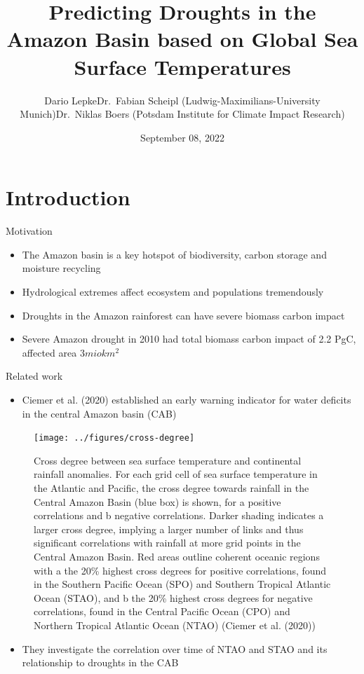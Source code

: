 \documentclass[
  ignorenonframetext,
]{beamer}
\title{Predicting Droughts in the Amazon Basin based on Global Sea
Surface Temperatures}
\author{Dario Lepke\newline Dr.~Fabian Scheipl
(Ludwig-Maximilians-University Munich)\newline Dr.~Niklas Boers (Potsdam
Institute for Climate Impact Research)}
\date{September 08, 2022}
\providecommand{\tightlist}{%
  \setlength{\itemsep}{0pt}\setlength{\parskip}{0pt}}
\begin{document}
\frame{\titlepage}

\begin{frame}[allowframebreaks]
  \tableofcontents[hideallsubsections]
\end{frame}
\hypertarget{introduction}{%
\section{Introduction}\label{introduction}}

\begin{frame}{Motivation}
\protect\hypertarget{motivation}{}
\begin{itemize}
\item
  The Amazon basin is a key hotspot of biodiversity, carbon storage and
  moisture recycling
\item
  Hydrological extremes affect ecosystem and populations tremendously
\item
  Droughts in the Amazon rainforest can have severe biomass carbon
  impact
\item
  Severe Amazon drought in 2010 had total biomass carbon impact of 2.2
  PgC, affected area \(3 mio km^2\)
\end{itemize}
\end{frame}

\begin{frame}{Related work}
\protect\hypertarget{related-work}{}
\begin{itemize}
\tightlist
\item
  Ciemer et al. (2020) established an early warning indicator for water
  deficits in the central Amazon basin (CAB)
\end{itemize}

\begin{figure}

{\centering \texttt{[image: ../figures/cross-degree]} 

}

\caption{Cross degree between sea surface temperature and continental rainfall anomalies. For each grid cell of sea surface temperature in the Atlantic and Pacific, the cross degree towards rainfall in the Central Amazon Basin (blue box) is shown, for a positive correlations and b negative correlations. Darker shading indicates a larger cross degree, implying a larger number of links and thus significant correlations with rainfall at more grid points in the Central Amazon Basin. Red areas outline coherent oceanic regions with a the 20\% highest cross degrees for positive correlations, found in the Southern Pacific Ocean (SPO) and Southern Tropical Atlantic Ocean (STAO), and b the 20\% highest cross degrees for negative correlations, found in the Central Pacific Ocean (CPO) and Northern Tropical Atlantic Ocean (NTAO) (Ciemer et al. (2020))}\label{fig:cross}
\end{figure}

\begin{itemize}
\tightlist
\item
  They investigate the correlation over time of NTAO and STAO and its
  relationship to droughts in the CAB
\end{itemize}
\end{frame}
\end{document}
